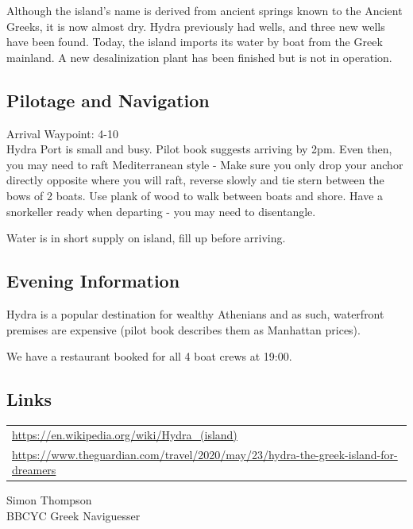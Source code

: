 \documentclass[12pt,a4paper,oneside]{article}
\begin{document}
\begin{multicols}{2}
Although the island's name is derived from ancient springs known to the Ancient Greeks, it is now almost dry. Hydra previously had wells, and three new wells have been found. Today, the island imports its water by boat from the Greek mainland. A new desalinization plant has been finished but is not in operation. 

\subsection*{Pilotage and Navigation}

Arrival Waypoint: 4-10\\

Hydra Port is small and busy. Pilot book suggests arriving by 2pm. Even then, you may need to raft Mediterranean style - Make sure you only drop your anchor directly opposite where you will raft, reverse slowly and tie stern between the bows of 2 boats. Use plank of wood to walk between boats and shore. Have a snorkeller ready when departing - you may need to disentangle.

Water is in short supply on island, fill up before arriving.

\subsection*{Evening Information}

Hydra is a popular destination for wealthy Athenians and as such, waterfront premises are expensive (pilot book describes them as Manhattan prices).  

We have a restaurant booked for all 4 boat crews at 19:00.

\subsection*{Links}
\begin{tabular}{p{7cm}}
\url{https://en.wikipedia.org/wiki/Hydra_(island)} \\ 
\url{https://www.theguardian.com/travel/2020/may/23/hydra-the-greek-island-for-dreamers}\\ 
\end{tabular} 

\end{multicols}

\noindent Simon Thompson\\
BBCYC Greek Naviguesser
\end{document}
